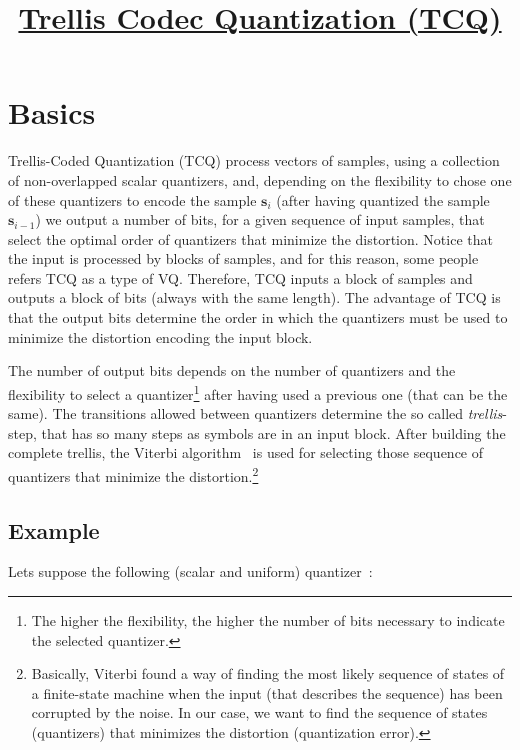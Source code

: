 
\title{\href{https://github.com/vicente-gonzalez-ruiz/trellis_coded_quantization}{Trellis Codec Quantization (TCQ)}}

\maketitle
\tableofcontents

\section{Basics}
Trellis-Coded Quantization (TCQ) process vectors of samples, using a
collection of non-overlapped scalar quantizers, and, depending on the
flexibility to chose one of these quantizers to encode the sample
${\mathbf s}_i$ (after having quantized the sample ${\mathbf
  s}_{i-1}$) we output a number of bits, for a given sequence of input
samples, that select the optimal order of quantizers that minimize the
distortion. Notice that the input is processed by blocks of samples,
and for this reason, some people refers TCQ as a type of
VQ. Therefore, TCQ inputs a block of samples and outputs a block of
bits (always with the same length). The advantage of TCQ is that the
output bits determine the order in which the quantizers must be used
to minimize the distortion encoding the input block.

The number of output bits depends on the number of quantizers and the
flexibility to select a quantizer\footnote{The higher the flexibility,
the higher the number of bits necessary to indicate the selected
quantizer.} after having used a previous one (that can be the
same). The transitions allowed between quantizers determine the so
called \emph{trellis}-step, that has so many steps as symbols are in
an input block. After building the complete trellis, the Viterbi
algorithm~\cite{} is used for selecting those sequence of quantizers
that minimize the distortion.\footnote{Basically, Viterbi found a way
of finding the most likely sequence of states of a finite-state
machine when the input (that describes the sequence) has been
corrupted by the noise. In our case, we want to find the sequence of
states (quantizers) that minimizes the distortion (quantization
error).}

\subsection*{Example}
Lets suppose the following (scalar and uniform) quantizer~\cite{}:

